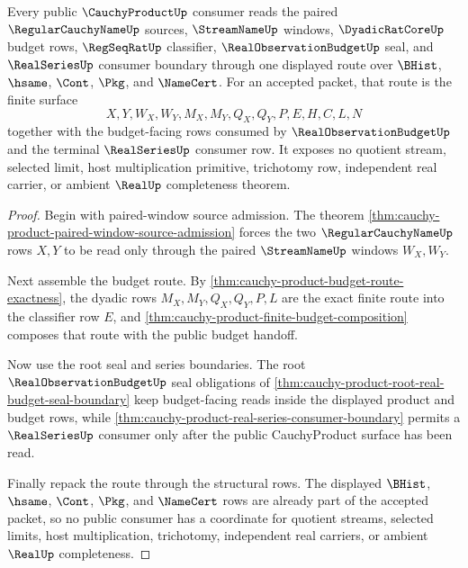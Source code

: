 \begin{theorem}
\label{thm:cauchy-product-main-surface-public-handoff}
Every public $\CauchyProductUp$ consumer reads the paired $\RegularCauchyNameUp$ sources, $\StreamNameUp$ windows, $\DyadicRatCoreUp$ budget rows, $\RegSeqRatUp$ classifier, $\RealObservationBudgetUp$ seal, and $\RealSeriesUp$ consumer boundary through one displayed route over $\BHist$, $\hsame$, $\Cont$, $\Pkg$, and $\NameCert$. For an accepted packet, that route is the finite surface
$$
X,Y,W_X,W_Y,M_X,M_Y,Q_X,Q_Y,P,E,H,C,L,N
$$
together with the budget-facing rows consumed by $\RealObservationBudgetUp$ and the terminal $\RealSeriesUp$ consumer row. It exposes no quotient stream, selected limit, host multiplication primitive, trichotomy row, independent real carrier, or ambient $\RealUp$ completeness theorem.
\end{theorem}
\begin{proof}
Begin with paired-window source admission. The theorem \autoref{thm:cauchy-product-paired-window-source-admission} forces the two $\RegularCauchyNameUp$ rows $X,Y$ to be read only through the paired $\StreamNameUp$ windows $W_X,W_Y$.

Next assemble the budget route. By \autoref{thm:cauchy-product-budget-route-exactness}, the dyadic rows $M_X,M_Y,Q_X,Q_Y,P,L$ are the exact finite route into the classifier row $E$, and \autoref{thm:cauchy-product-finite-budget-composition} composes that route with the public budget handoff.

Now use the root seal and series boundaries. The root $\RealObservationBudgetUp$ seal obligations of \autoref{thm:cauchy-product-root-real-budget-seal-boundary} keep budget-facing reads inside the displayed product and budget rows, while \autoref{thm:cauchy-product-real-series-consumer-boundary} permits a $\RealSeriesUp$ consumer only after the public CauchyProduct surface has been read.

Finally repack the route through the structural rows. The displayed $\BHist$, $\hsame$, $\Cont$, $\Pkg$, and $\NameCert$ rows are already part of the accepted packet, so no public consumer has a coordinate for quotient streams, selected limits, host multiplication, trichotomy, independent real carriers, or ambient $\RealUp$ completeness.
\end{proof}

